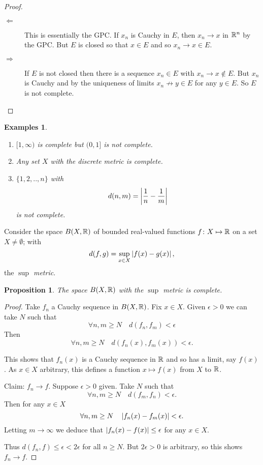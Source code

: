 \documentclass{notes}
\theoremstyle{plain}
\newtheorem{proposition}{Proposition}[chapter]
\newtheorem*{examples}{Examples}
\newcommand{\Forall}[1]{\forall #1 \quad}
\begin{document}
\begin{proof}
\ 

\begin{description}
\item[$\Leftarrow$] This is essentially the GPC.
If $ x_{n} $ is Cauchy in $ E $, then $ x_{n}\to x $ in 
$ \mathbb{R}^{n}  $ by the GPC.  But $E$ is closed so that $ x \in E $ and so $ 
x_{n} \to x \in E $.

\item[$\Rightarrow$] If $ E $ is not closed then there is a
  sequence $ x_{n} \in E $ with
$x_{n}\to x \not\in E$.
But $ x_{n} $ is Cauchy and by the uniqueness of limits
$ x_{n} \not\to y \in E $ for any $ y \in E $.
So $ E $ is not complete.
\end{description}
\end{proof}

\begin{examples}
\

\begin{enumerate}
\item $ [1,\infty) $ is complete but $ (0,1] $ is not complete.
\item Any set $ X $ with the discrete metric is complete.
\item $ \{ 1,2,..,n\} $ with \[ d(n,m) = 
\left|\frac{1}{n}-\frac{1}{m}\right| \] is not complete.
\end{enumerate}
\end{examples}

Consider the space $ B(X, \mathbb{R}) $ of bounded real-valued functions $ 
f\colon X \mapsto \mathbb{R} $ on a set $ X \neq \emptyset $; with
\[ d(f,g) = \sup_{x \in X}\left|f(x)-g(x)\right|, \] the \emph{$\sup$ metric}.

\begin{proposition}
The space $ B(X,\mathbb{R}) $ with the $\sup$ metric is complete.
\end{proposition}

\begin{proof}
Take $ f_{n} $ a Cauchy sequence in $ B(X,\mathbb{R}) $.
Fix $ x \in X $.  Given $ \epsilon >0 $ we can take $ N $ such that
\[ \Forall{n,m \geq N} d(f_{n},f_{m}) < \epsilon \]
Then
\[ \Forall{n,m \geq N} d(f_{n}(x),f_{m}(x)) < \epsilon. \]

This shows that $ f_{n}(x) $ is a Cauchy sequence in $ \mathbb{R} $ and so 
has a limit, say $ f(x) $.
As $ x \in X $ arbitrary, this defines a function
$x \mapsto f(x)$ from $ X $ to $ \mathbb{R} $.

Claim: $ f_{n} \to f $.
Suppose $ \epsilon>0 $ given.
Take $ N $ such that
\[ \Forall{n,m \geq N} d(f_{m},f_{n}) < \epsilon. \]
Then for any $ x \in X $
\[ \Forall{n,m \geq N} \abs{f_{n}(x)-f_{m}(x)} < \epsilon. \]
Letting $ m \to \infty $ we deduce that
$\left|f_{n}(x)-f(x)\right| \leq \epsilon$
for any $ x \in X $.

Thus
$d(f_{n},f) \leq \epsilon < 2\epsilon$ for all $ n \geq N $.
But $ 2 \epsilon>0$ is arbitrary, so this shows $ f_{n} \to 
f $.
\end{proof}
\end{document}

